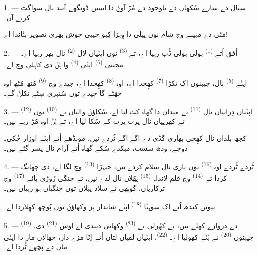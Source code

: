 \VUsaut{4.0mm}

1. --- سیال دے سارے سُکھاں دے باوجود  دے مُڑ آوݨ دا اسیں ڈونگھے آنند
نال سواگت کرنے آں۔

مئی دے مہینے وچ شام نوں پیلی دا وِہڑا کِہو جیہی جوش بھری تصویر بݨاندا اے!

2. --- اُفق اُتے  \textsuperscript{(1)} ہولی ہولی ڈُب رہیا اے، تے
 \textsuperscript{(3)} نوں اپݨیاں لال  \textsuperscript{(2)}
نال بھر رہیا اے۔ محنتی  \textsuperscript{(6)} اپݨی 
\textsuperscript{(4)} وا ہُݨ دی کاہلی وچ اے۔

اپݨے  \textsuperscript{(5)} نال، جیہنوں اک تکڑا 
\textsuperscript{(7)} کھِچدا اے، اوہ  \textsuperscript{(8)} کھِچدا اے،
جیدے وچ  \textsuperscript{(9)} مُٹھ مُٹھ اوہ 
چھَٹے گا جیدے توں سُنہری سِٹے نکلݨ گے۔

3. --- اپݨیاں دِرانیاں نال  \textsuperscript{(11)} نے
میدان دا گھاہ کٹ لیا اے، سُکاؤݨ والیاں نے  \textsuperscript{(10)}
نوں  \textsuperscript{(12)} تے کھرپیاں نال پرت پرت کے سُکا لیا اے،
تے ہُݨ اوہ مُڑ رہے نیں۔

کجھ بلداں نال کھِچی بھاری گڈی دے اگے اگے ٹُردے نیں، مونڈھے اُتے اپݨے اوزار چُکی۔
دوجے، ودھ سست، مہکدے سُکے گھاہ اُتے آرام نال پسر گئے نیں۔

4. --- ٹُردے ٹُردے اوہ  \textsuperscript{(16)} نوں یاری نال سلام کردے
نیں، جیہڑا  \textsuperscript{(13)} وچ لگا اے،  دی چھانگ کردا تے  \textsuperscript{(14)} وچ قلم
لاندا۔  \textsuperscript{(15)} پھُلاں نال لدے نیں، تے چنگی
رُوڑی پائے  \textsuperscript{(17)} وچ ترکاریاں، گوبھی تے سلاد
پہلاں توں چنگیاں ہو رہیاں نیں۔

نیویں کندھ اُتے اک سوہݨا  \textsuperscript{(18)} اپݨے شاندار پر وکھاؤݨ
نوں پُوچھ کھِلاردا اے۔

\VUsaut{3.0mm}

5. ---  \textsuperscript{(19)} دے دروازے کھلے نیں، تے کھُرلی تے
 \textsuperscript{(23)} وکھائی دیندی اے اوس 
\textsuperscript{(21)} دی، جیہنوں  \textsuperscript{(20)} نے ہُݨے کھولیا
اے۔  \textsuperscript{(22)}، اپݨیاں لمیاں لتاں اُتے اِنّا مزے دار،
چھالاں مار دا اپݨی ماں دے پچھے ٹُردا اے۔

